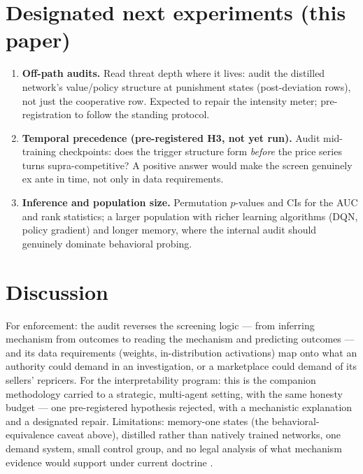 \documentclass[11pt]{article}
\begin{document}
\section{Designated next experiments (this paper)}\label{sec:next}
\begin{enumerate}
\item \textbf{Off-path audits.} Read threat depth where it lives: audit
the distilled network's value/policy structure at punishment states
(post-deviation rows), not just the cooperative row. Expected to repair
the intensity meter; pre-registration to follow the standing protocol.
\item \textbf{Temporal precedence (pre-registered H3, not yet run).} Audit
mid-training checkpoints: does the trigger structure form \emph{before}
the price series turns supra-competitive? A positive answer would make the
screen genuinely ex ante in time, not only in data requirements.
\item \textbf{Inference and population size.} Permutation $p$-values and
CIs for the AUC and rank statistics; a larger population with richer
learning algorithms (DQN, policy gradient) and longer memory, where the
internal audit should genuinely dominate behavioral probing.
\end{enumerate}

\section{Discussion}\label{sec:discussion}
For enforcement: the audit reverses the screening logic --- from inferring
mechanism from outcomes to reading the mechanism and predicting outcomes
--- and its data requirements (weights, in-distribution activations) map
onto what an authority could demand in an investigation, or a marketplace
could demand of its sellers' repricers. For the interpretability program:
this is the companion methodology carried to a strategic, multi-agent
setting, with the same honesty budget --- one pre-registered hypothesis
rejected, with a mechanistic explanation and a designated repair.
Limitations: memory-one states (the behavioral-equivalence caveat above),
distilled rather than natively trained networks, one demand system, small
control group, and no legal analysis of what mechanism evidence would
support under current doctrine \citep{harrington2018}.
\end{document}
